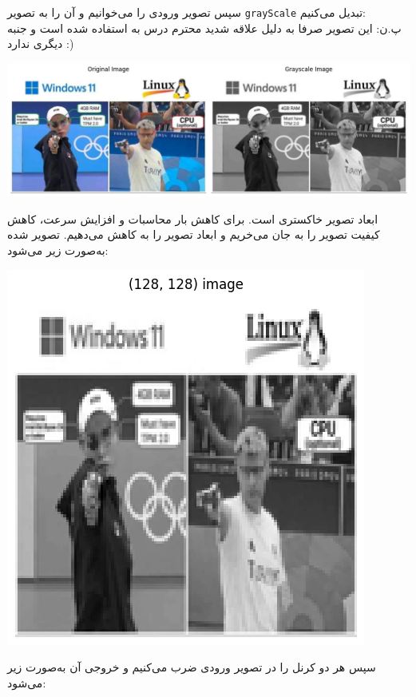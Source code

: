 \begin{qsolve}
	سپس تصویر ورودی را می‌خوانیم و آن را به تصویر \texttt{grayScale} تبدیل می‌کنیم: \\ پ.ن: این تصویر صرفا به دلیل علاقه شدید  محترم درس به  استفاده شده است و جنبه دیگری ندارد :) 
	
	\begin{center}
		\includegraphics*[width=1\linewidth]{pics/img19.png}
		\label{تصویر اصلی ورودی}
	\end{center}
	
	ابعاد تصویر خاکستری  است. برای کاهش بار محاسبات و افزایش سرعت، کاهش کیفیت تصویر را به جان می‌خریم و ابعاد تصویر را به  کاهش می‌دهیم. تصویر  شده به‌صورت زیر می‌شود:
	
	\begin{center}
		\includegraphics*[width=0.5\linewidth]{pics/img20.png}
		\label{تصویر Resize شده}
	\end{center}
	
	سپس هر دو کرنل را در تصویر ورودی ضرب می‌کنیم و خروجی آن به‌صورت زیر می‌شود:


\end{qsolve}




